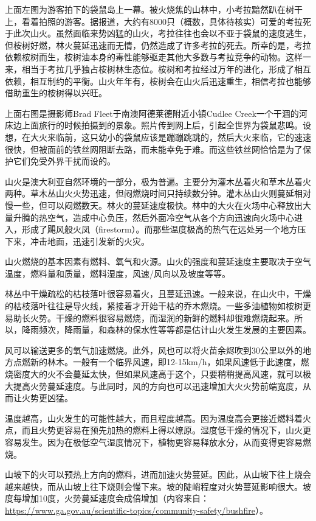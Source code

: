 \documentclass[]{book}
\begin{document}
上面左图为游客拍下的袋鼠岛上一幕。被火烧焦的山林中，小考拉黯然趴在树干上，看着拍照的游客。据报道，大约有8000只（概数，具体待核实）可爱的考拉死于此次山火。虽然面临来势凶猛的山火，考拉往往也会以不亚于袋鼠的速度逃生，但桉树好燃，林火蔓延迅速而无情，仍然造成了许多考拉的死去。所幸的是，考拉依赖桉树而生，桉树油本身的毒性能够驱走其他大多数与考拉竞争的动物。这样一来，相当于考拉几乎独占桉树林生态位。桉树和考拉经过万年的进化，形成了相互依赖，相互制约的平衡。山火年年有，桉树会在山火后迅速重生，相信考拉也能够借助重生的桉树得以兴旺。

上面右图是摄影师Brad Fleet于南澳阿德莱德附近小镇Cudlee Creek一个干涸的河床边上面旅行的时候拍摄到的景象。照片传到网上后，引起全世界为袋鼠悲鸣。设想，在大火来临前，这只幼小的袋鼠应该是蹦蹦跳跳的，然后大火来临，它的速速很快，但被面前的铁丝网阻断去路，而未能幸免于难。而这些铁丝网恰恰是为了保护它们免受外界干扰而设的。

山火是澳大利亚自然环境的一部分，极为普遍。主要分为灌木丛着火和草木丛着火两种。草木丛山火火势迅速，但闷燃烧时间只持续数分钟。灌木丛山火则蔓延相对慢一些，但可以闷燃数天。林火的蔓延速度极快。林中的大火在火场中心释放出大量升腾的热空气，造成中心负压，然后外面冷空气从各个方向迅速向火场中心进入，形成了飓风般火凤（firestorm）。而那些温度极高的热气在远处另一个地方压下来，冲击地面，迅速引发新的火灾。

山火燃烧的基本因素有燃料、氧气和火源。山火的强度和蔓延速度主要取决于空气温度，燃料量和质量，燃料湿度，风速/风向以及坡度等等。

林丛中干燥疏松的枯枝落叶很容易着火，且蔓延迅速。一般来说，在山火中，干燥的枯枝落叶往往是导火线，紧接着才开始干枯的乔木燃烧。一些多油植物如桉树更易助长火势。干燥的燃料很容易燃烧，而湿润的新鲜的燃料却很难燃烧起来。所以，降雨频次，降雨量，和森林的保水性等等都是估计山火发生发展的主要因素。

风可以输送更多的氧气加速燃烧。此外，风也可以将火苗余烬吹到30公里以外的地方点燃新的林木。一般有一个临界风速，即12-15km/h，如果风速低于此速度，燃烧密度大的火不会蔓延太快，但如果风速高于这个，只要稍稍提高风速，就可以极大提高火势蔓延速度。与此同时，风的方向也可以迅速增加大火火势前端宽度，从而让火势更凶猛。

温度越高，山火发生的可能性越大，而且程度越高。因为温度高会更接近燃料着火点，而且火势更容易在预先加热的燃料上得以燎原。湿度低干燥的情况下，山火更容易发生。因为在极低空气湿度情况下，植物更容易释放水分，从而变得更容易燃烧。

山坡下的火可以预热上方向的燃料，进而加速火势蔓延。因此，从山坡下往上烧会越来越快，而从山坡上往下烧则会慢下来。坡的陡峭程度对火势蔓延影响很大。坡度每增加10度，火势蔓延速度会成倍增加（内容来自：\url{https://www.ga.gov.au/scientific-topics/community-safety/bushfire}）。
\end{document}
